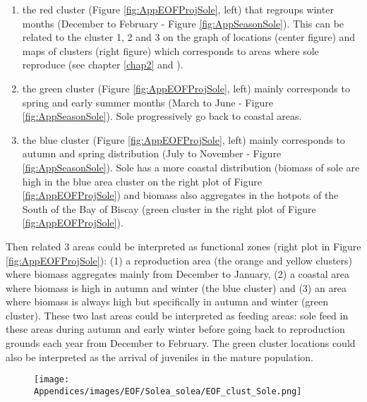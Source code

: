 \begin{enumerate}

\item the red cluster (Figure \ref{fig:AppEOFProjSole}, left) that regroups winter months (December to February - Figure    \ref{fig:AppSeasonSole}). This can be related to the cluster 1, 2 and 3 on the graph of locations (center figure) and maps of clusters (right figure) which corresponds to areas where sole reproduce (see chapter \ref{chap2} and \textcite{arbault-estimation-1986}).

\item the green cluster (Figure \ref{fig:AppEOFProjSole}, left) mainly corresponds to spring and early summer months (March to June - Figure \ref{fig:AppSeasonSole}). Sole progressively go back to coastal areas.

\item the blue cluster (Figure \ref{fig:AppEOFProjSole}, left) mainly corresponds to autumn and spring distribution (July to November - Figure \ref{fig:AppSeasonSole}). Sole has a more coastal distribution (biomass of sole are high in the blue area cluster on the right plot of Figure \ref{fig:AppEOFProjSole}) and biomass also aggregates in the hotpots of the South of the Bay of Biscay (green cluster in the right plot of Figure \ref{fig:AppEOFProjSole}).

\end{enumerate}


Then related 3 areas could be interpreted as functional zones (right plot in Figure \ref{fig:AppEOFProjSole}): (1) a reproduction area (the orange and yellow clusters) where biomass aggregates mainly from December to January, (2) a coastal area where biomass is high in autumn and winter (the blue cluster) and (3) an area where biomass is always high but specifically in autumn and winter (green cluster). These two last areas could be interpreted as feeding areas: sole feed in these areas during autumn and early winter before going back to reproduction grounds each year from December to February. The green cluster locations could also be interpreted as the arrival of juveniles in the mature population.

\newpage

\begin{figure}[H]
   \begin{center}
      \texttt{[image: Appendices/images/EOF/Solea\_solea/EOF\_clust\_Sole.png]}
   \end{center}
\end{figure}

